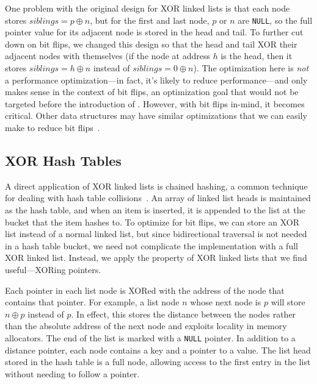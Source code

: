 One problem with the original design for XOR linked lists is that each node
stores $siblings = p \oplus n$, but for the first and last node, $p$ or $n$ are
\texttt{NULL}, so the full pointer value for its adjacent node is stored in the
head and tail. To further cut down on bit flips, we changed this design so that
the head and tail XOR their adjacent nodes with themselves (if the node at
address $h$ is the head, then it stores $siblings = h \oplus n$ instead of
$siblings = 0 \oplus n$). The optimization here is \textit{not} a performance
optimization---in fact, it's likely to reduce performance---and only makes sense
in the context of bit flips, an optimization goal that would not be
targeted before the introduction of \NVM. However, with bit flips in-mind, it
becomes critical. Other data structures may have similar optimizations that we
can easily make to reduce bit flips~.

\subsection{XOR Hash Tables}
\label{sec:xht_design}

A direct application of XOR linked lists is chained hashing, a common
technique for dealing with hash table collisions~\cite{clrs}. An array of linked list heads
is maintained as the hash table, and when an item is inserted, it is appended to
the list at the bucket that the item hashes to. To optimize for bit flips,
we can store an XOR list instead of a normal linked list, but
since bidirectional traversal is not needed in a hash table
bucket, we need not complicate the implementation with a full XOR linked
list. Instead, we apply the property of XOR linked lists that we find
useful---XORing pointers.

Each pointer in each list node is XORed with the address of the node that
contains that pointer. For example, a list node $n$ whose next node is $p$ will
store $n \oplus p$ instead of $p$. In effect, this stores the distance between
the nodes rather than the absolute address of the next node and exploits
locality in memory allocators. The end of the list is marked with a \texttt{NULL}
pointer. In addition to a distance pointer, each node contains a key and a
pointer to a value. The list head stored in the hash table is a full node,
allowing access to the first entry in the list without needing to follow a
pointer.

